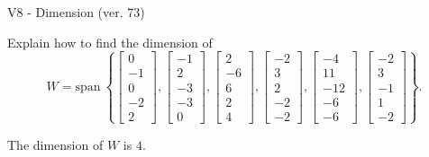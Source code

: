 \begin{exercise}
  \begin{exerciseTitle}V8 - Dimension (ver. 73)\end{exerciseTitle}
  \begin{exerciseStatement}
    Explain how to find the dimension of 
\[W=\mathrm{span}\ \left\{\left[\begin{array}{r}
0 \\
-1 \\
0 \\
-2 \\
2
\end{array}\right] , \left[\begin{array}{r}
-1 \\
2 \\
-3 \\
-3 \\
0
\end{array}\right] , \left[\begin{array}{r}
2 \\
-6 \\
6 \\
2 \\
4
\end{array}\right] , \left[\begin{array}{r}
-2 \\
3 \\
2 \\
-2 \\
-2
\end{array}\right] , \left[\begin{array}{r}
-4 \\
11 \\
-12 \\
-6 \\
-6
\end{array}\right] , \left[\begin{array}{r}
-2 \\
3 \\
-1 \\
1 \\
-2
\end{array}\right]\right\}.\]



  \end{exerciseStatement}
  \begin{exerciseAnswer}
   The dimension of \(W\) is  \(4\).
  


  \end{exerciseAnswer}
\end{exercise}